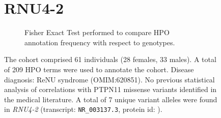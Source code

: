 \begin{figure}[htbp]
\section*{RNU4-2}
\centering
\begin{subfigure}[b]{0.95\textwidth}
\centering
{}
\captionsetup{justification=raggedright,singlelinecheck=false}
\caption{Fisher Exact Test performed to compare HPO annotation frequency with respect to genotypes.}
\end{subfigure}

\vspace{2em}

\caption{ The cohort comprised 61 individuals (28 females, 33 males). A total of 209 HPO terms were used to annotate the cohort. Disease diagnosis: ReNU syndrome (OMIM:620851). No previous statistical analysis of correlations with PTPN11 missense variants identified in the medical literature. A total of 7 unique variant alleles were found in \textit{RNU4-2} (transcript: \texttt{NR\_003137.3}, protein id: \texttt{}).}
\end{figure}
